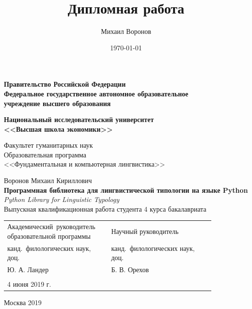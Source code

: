 \documentclass[a4paper,12pt]{article}
\author{Михаил Воронов}
\title{Дипломная работа}
\date{\today}
\begin{document}

\newpage
\thispagestyle{empty}
\begin{center}
    \textbf{Правительство Российской Федерации \\
        Федеральное государственное автономное образовательное \\
        учреждение высшего образования}
    \vspace{1cm}

    \textbf{Национальный исследовательский университет \\ <<Высшая школа экономики>>}
\end{center}

\vspace{1cm}
\begin{flushright}
    \noindent
    Факультет гуманитарных наук \\
    Образовательная программа \\
    <<Фундаментальная и компьютерная лингвистика>>
\end{flushright}

\begin{center}
    Воронов Михаил Кириллович \\
    \vspace{2ex}
    \textbf{Программная библиотека для лингвистической типологии на языке Python} \\
    \textit{Python Library for Linguistic Typology}\\
    \vspace{3ex}
    Выпускная квалификационная работа студента 4 курса бакалавриата 
\end{center}
\vspace{3ex}
\begin{tabular}{p{0.4\linewidth}p{0.45\linewidth}}
    Академический~руководитель образовательной программы & Научный руководитель \\
    канд.~филологических наук, доц. & канд.~филологических наук, доц.\\
    Ю. А. Ландер & Б. В. Орехов \\
    & \\ 
    4 июня 2019 г.
\end{tabular}

\begin{center}
    Москва 2019
\end{center}

\newpage

\setcounter{tocdepth}{2}
\tableofcontents
\end{document}
